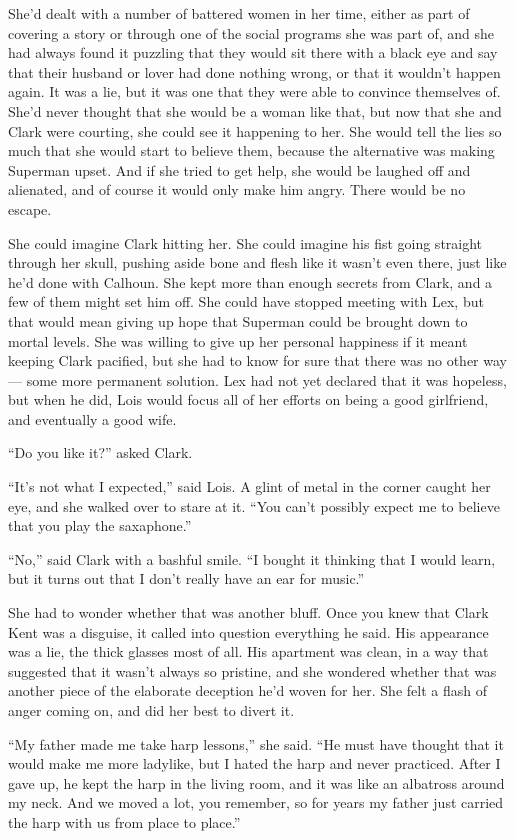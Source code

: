 She'd dealt with a number of battered women in her time, either as part
of covering a story or through one of the social programs she was part
of, and she had always found it puzzling that they would sit there with
a black eye and say that their husband or lover had done nothing wrong,
or that it wouldn't happen again. It was a lie, but it was one that they
were able to convince themselves of. She'd never thought that she would
be a woman like that, but now that she and Clark were courting, she
could see it happening to her. She would tell the lies so much that she
would start to believe them, because the alternative was making Superman
upset. And if she tried to get help, she would be laughed off and
alienated, and of course it would only make him angry. There would be no
escape.

She could imagine Clark hitting her. She could imagine his fist going
straight through her skull, pushing aside bone and flesh like it wasn't
even there, just like he'd done with Calhoun. She kept more than enough
secrets from Clark, and a few of them might set him off. She could have
stopped meeting with Lex, but that would mean giving up hope that
Superman could be brought down to mortal levels. She was willing to give
up her personal happiness if it meant keeping Clark pacified, but she
had to know for sure that there was no other way --- some more permanent
solution. Lex had not yet declared that it was hopeless, but when he
did, Lois would focus all of her efforts on being a good girlfriend, and
eventually a good wife.

``Do you like it?'' asked Clark.

``It's not what I expected,'' said Lois. A glint of metal in the corner
caught her eye, and she walked over to stare at it. ``You can't possibly
expect me to believe that you play the saxaphone.''

``No,'' said Clark with a bashful smile. ``I bought it thinking that I
would learn, but it turns out that I don't really have an ear for
music.''

She had to wonder whether that was another bluff. Once you knew that
Clark Kent was a disguise, it called into question everything he said.
His appearance was a lie, the thick glasses most of all. His apartment
was clean, in a way that suggested that it wasn't always so pristine,
and she wondered whether that was another piece of the elaborate
deception he'd woven for her. She felt a flash of anger coming on, and
did her best to divert it.

``My father made me take harp lessons,'' she said. ``He must have
thought that it would make me more ladylike, but I hated the harp and
never practiced. After I gave up, he kept the harp in the living room,
and it was like an albatross around my neck. And we moved a lot, you
remember, so for years my father just carried the harp with us from
place to place.''

